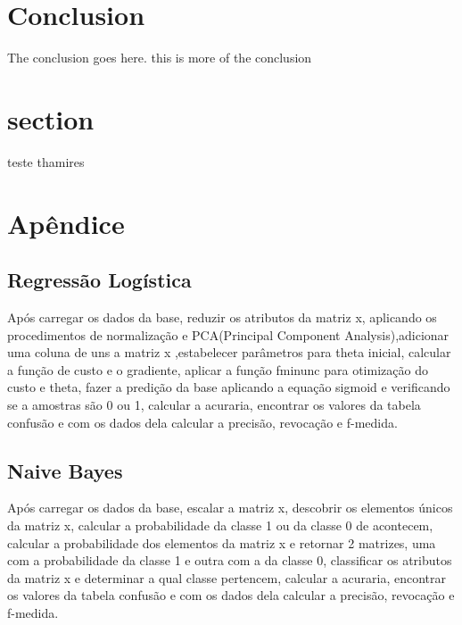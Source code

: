 \documentclass[10pt, conference, compsocconf]{IEEEtran}
\begin{document}
\section{Conclusion}
The conclusion goes here. this is more of the conclusion


\section{section}
teste thamires

%
\section{Apêndice}

\subsection{Regressão Logística}
Após carregar os dados da base, reduzir os atributos da matriz x, aplicando os procedimentos de normalização e PCA(Principal Component Analysis),adicionar uma coluna de uns a matriz x ,estabelecer parâmetros para theta inicial, calcular a função de custo e o gradiente, aplicar a função fminunc para otimização do custo e theta, fazer a predição da base aplicando a equação sigmoid e verificando se a amostras são 0 ou 1, calcular a acuraria, encontrar os valores da tabela confusão e com os dados dela calcular a precisão, revocação e f-medida.

\subsection{Naive Bayes}
Após carregar os dados da base, escalar a matriz x, descobrir os elementos únicos da matriz x, calcular a probabilidade da classe 1 ou da classe 0 de acontecem, calcular a probabilidade dos elementos da matriz x e retornar 2 matrizes, uma com a probabilidade da classe 1 e outra com a da classe 0, classificar os atributos da matriz x e determinar a qual classe pertencem, calcular a acuraria, encontrar os valores da tabela confusão e com os dados dela calcular a precisão, revocação e f-medida.



\end{document}
